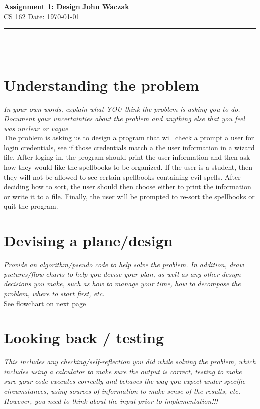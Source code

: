 \documentclass[a4paper, 11pt]{article}
\begin{document}
\noindent
\large\textbf{Assignment 1: Design} \hfill \textbf{John Waczak} \\
\normalsize CS 162 \hfill  Date: \today 
\par\noindent\rule{\textwidth}{0.4pt} \\\\



\section*{Understanding the problem}

\textit{In your own words, explain what YOU think the problem is asking you to
  do.  Document your uncertainties about the problem and anything else that you
  feel was unclear or vague}\\

The problem is asking us to design a program that will check a prompt a user for
login credentials, see if those credentials match a the user information in a
wizard file. After loging in, the program should print the user information and
then ask how they would like the spellbooks to be organized. If the user is a
student, then they will not be allowed to see certain spellbooks containing evil
spells. After deciding how to sort, the user should then choose either to print
the information or write it to a file. Finally, the user will be prompted to
re-sort the spellbooks or quit the program.

\section*{Devising a plane/design}

\textit{Provide an algorithm/pseudo code to help solve the problem. In addition,
  draw pictures/flow charts to help you devise your plan, as well as any other
  design decisions you make, such as how to manage your time, how to decompose
  the problem, where to start first, etc. }\\ 

See flowchart on next page




\section*{Looking back / testing}

\textit{This includes any checking/self-reflection you did while solving the
  problem, which includes using a calculator to make sure the output is correct,
  testing to make sure your code executes correctly and behaves the way you
  expect under specific circumstances, using sources of information to make
  sense of the results, etc. However, you need to think about the input prior to
  implementation!!!}\\
\vspace{5em}
\end{document}

